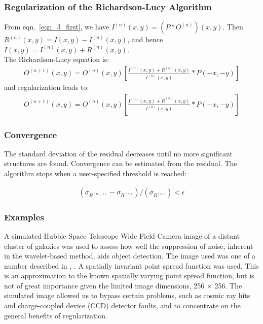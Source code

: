 \documentclass[11pt,a4paper]{article}
\begin{document}
\subsubsection{Regularization of the Richardson-Lucy Algorithm}

From eqn.\ \ref{eqn_3_first}, 
we have $I^{(n)}(x,y) =  (P * O^{(n)}) (x,y)$. Then
 $R^{(n)}(x,y) = I(x,y) - I^{(n)}(x,y) $, and 
hence $ I(x,y) = I^{(n)}(x,y) + R^{(n)}(x,y)$.\\
The Richardson-Lucy equation is:
\begin{eqnarray}
O^{(n+1)}(x,y) = O^{(n)}(x,y) [ \frac{I^{(n)}(x,y) + 
               R^{(n)}(x,y)}{I^{(n)}(x,y)} * P(-x,-y) ]
\end{eqnarray}
and regularization leads to: 
\begin{eqnarray}
O^{(n+1)}(x,y) = O^{(n)}(x,y) [ \frac{I^{(n)}(x,y) + 
               {\bar{R}}^{(n)}(x,y)}{I^{(n)}(x,y)} * P(-x,-y) ]
\end{eqnarray}
 
\subsubsection{Convergence}
 
The standard deviation of the residual decreases until no more
significant structures are found. Convergence can be estimated
from the residual. The algorithm stops when a user-specified threshold is
reached:
 
\begin{eqnarray}
(\sigma_{{R}^{(n-1)}} - \sigma_{{R}^{(n)}})/(\sigma_{{R}^{(n)}})   < \epsilon
\end{eqnarray}


\subsubsection{Examples}
 
A simulated Hubble Space Telescope 
Wide Field Camera image of a distant cluster of galaxies
was used to assess how well the suppression of noise, inherent in the 
wavelet-based method, aids object detection.
The image used was one of a number described in \cite{rest:freudcaul93a},
\cite{rest:freudcaul93b}. 
A spatially invariant point spread function 
was used.  This is an approximation to the known spatially
varying point spread function, but is not of great importance given the 
limited image dimensions, 256 $\times$ 256.  The simulated image allowed us
to bypass certain problems, such as cosmic ray hits and 
charge-coupled device (CCD) detector faults,
and to concentrate on the general benefits of regularization.
 
\end{document}
